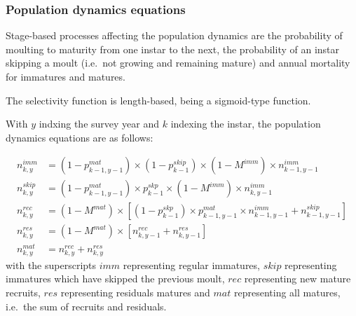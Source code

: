 \documentclass[
]{article}
\begin{document}
\hypertarget{population-dynamics-equations}{%
\subsubsection{Population dynamics
equations}\label{population-dynamics-equations}}

Stage-based processes affecting the population dynamics are the
probability of moulting to maturity from one instar to the next, the
probability of an instar skipping a moult (i.e.~not growing and
remaining mature) and annual mortality for immatures and matures.

The selectivity function is length-based, being a sigmoid-type function.

With \(y\) indxing the survey year and \(k\) indexing the instar, the
population dynamics equations are as follows:

\[
\begin{aligned}
   n_{k,y}^{imm}  &= (1-p_{k-1,y-1}^{mat}) \times (1-p_{k-1}^{skip}) \times (1-M^{imm}) \times n_{k-1,y-1}^{imm} \\
   n_{k,y}^{skip} &= (1-p_{k-1,y-1}^{mat}) \times p_{k-1}^{skp} \times (1-M^{imm}) \times n_{k,y-1}^{imm} \\
   n_{k,y}^{rec}  &= (1-M^{mat}) \times \left[(1-p_{k-1}^{skp}) \times p_{k-1,y-1}^{mat} \times n_{k-1,y-1}^{imm} + n_{k-1,y-1}^{skip} \right] \\  
   n_{k,y}^{res}  &= (1-M^{mat}) \times \left[n_{k,y-1}^{rec} + n_{k,y-1}^{res} \right] \\ 
   n_{k,y}^{mat}  &= n_{k,y}^{rec} + n_{k,y}^{res}
\end{aligned}
\] with the superscripts \(imm\) representing regular immatures,
\(skip\) representing immatures which have skipped the previous moult,
\(rec\) representing new mature recruits, \(res\) representing residuals
matures and \(mat\) representing all matures, i.e.~the sum of recruits
and residuals.
\end{document}
